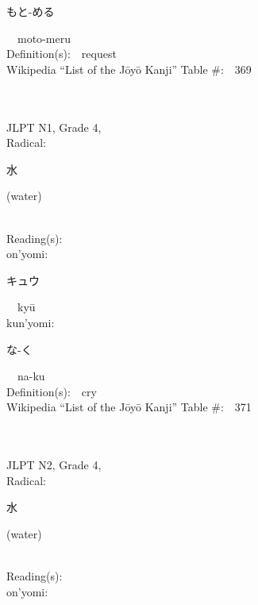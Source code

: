 \begin{multicols}{2}
{\hspace*{2em}}{\begin{CJK}{UTF8}{min} もと-める \end{CJK}}\ \ moto-meru\ \ \\
Definition(s):\ \ request \\
Wikipedia ``List of the J\=oy\=o Kanji'' Table \#:\ \ 369 \\
\ \ \\
{\fontsize{34pt}{40pt}  }\ \ \\  %
{JLPT N1, Grade 4, \\Radical:\ \ {\begin{CJK}{UTF8}{min} 水 \end{CJK}} (water) } \\
Reading(s):\ \ \\
{\hspace*{1em}}on'yomi:\ \ \\
{\hspace*{2em}}{\begin{CJK}{UTF8}{min} キュウ \end{CJK}}\ \ ky\=u\ \ \\
{\hspace*{1em}}kun'yomi:\ \ \\
{\hspace*{2em}}{\begin{CJK}{UTF8}{min} な-く \end{CJK}}\ \ na-ku\ \ \\
Definition(s):\ \ cry \\
Wikipedia ``List of the J\=oy\=o Kanji'' Table \#:\ \ 371 \\
\ \ \\
{\fontsize{34pt}{40pt}  }\ \ \\  %
{JLPT N2, Grade 4, \\Radical:\ \ {\begin{CJK}{UTF8}{min} 水 \end{CJK}} (water) } \\
Reading(s):\ \ \\
{\hspace*{1em}}on'yomi:\ \ \\

\end{multicols}
